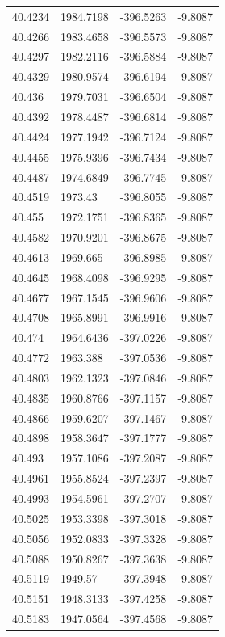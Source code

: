 \begin{table}[H]
\begin{tabular}{llll}
40.4234 & 1984.7198 & -396.5263 & -9.8087 \\
40.4266 & 1983.4658 & -396.5573 & -9.8087 \\
40.4297 & 1982.2116 & -396.5884 & -9.8087 \\
40.4329 & 1980.9574 & -396.6194 & -9.8087 \\
40.436 & 1979.7031 & -396.6504 & -9.8087 \\
40.4392 & 1978.4487 & -396.6814 & -9.8087 \\
40.4424 & 1977.1942 & -396.7124 & -9.8087 \\
40.4455 & 1975.9396 & -396.7434 & -9.8087 \\
40.4487 & 1974.6849 & -396.7745 & -9.8087 \\
40.4519 & 1973.43 & -396.8055 & -9.8087 \\
40.455 & 1972.1751 & -396.8365 & -9.8087 \\
40.4582 & 1970.9201 & -396.8675 & -9.8087 \\
40.4613 & 1969.665 & -396.8985 & -9.8087 \\
40.4645 & 1968.4098 & -396.9295 & -9.8087 \\
40.4677 & 1967.1545 & -396.9606 & -9.8087 \\
40.4708 & 1965.8991 & -396.9916 & -9.8087 \\
40.474 & 1964.6436 & -397.0226 & -9.8087 \\
40.4772 & 1963.388 & -397.0536 & -9.8087 \\
40.4803 & 1962.1323 & -397.0846 & -9.8087 \\
40.4835 & 1960.8766 & -397.1157 & -9.8087 \\
40.4866 & 1959.6207 & -397.1467 & -9.8087 \\
40.4898 & 1958.3647 & -397.1777 & -9.8087 \\
40.493 & 1957.1086 & -397.2087 & -9.8087 \\
40.4961 & 1955.8524 & -397.2397 & -9.8087 \\
40.4993 & 1954.5961 & -397.2707 & -9.8087 \\
40.5025 & 1953.3398 & -397.3018 & -9.8087 \\
40.5056 & 1952.0833 & -397.3328 & -9.8087 \\
40.5088 & 1950.8267 & -397.3638 & -9.8087 \\
40.5119 & 1949.57 & -397.3948 & -9.8087 \\
40.5151 & 1948.3133 & -397.4258 & -9.8087 \\
40.5183 & 1947.0564 & -397.4568 & -9.8087 \\

\end{tabular}
\end{table}
